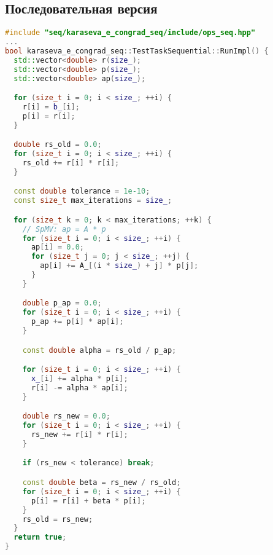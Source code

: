 \documentclass[12pt]{article}
\begin{document}
\subsection{Последовательная версия}
\begin{lstlisting}[language=C++]
#include "seq/karaseva_e_congrad_seq/include/ops_seq.hpp"
...
bool karaseva_e_congrad_seq::TestTaskSequential::RunImpl() {
  std::vector<double> r(size_);
  std::vector<double> p(size_);
  std::vector<double> ap(size_);

  for (size_t i = 0; i < size_; ++i) {
    r[i] = b_[i];
    p[i] = r[i];
  }

  double rs_old = 0.0;
  for (size_t i = 0; i < size_; ++i) {
    rs_old += r[i] * r[i];
  }

  const double tolerance = 1e-10;
  const size_t max_iterations = size_;

  for (size_t k = 0; k < max_iterations; ++k) {
    // SpMV: ap = A * p
    for (size_t i = 0; i < size_; ++i) {
      ap[i] = 0.0;
      for (size_t j = 0; j < size_; ++j) {
        ap[i] += A_[(i * size_) + j] * p[j];
      }
    }

    double p_ap = 0.0;
    for (size_t i = 0; i < size_; ++i) {
      p_ap += p[i] * ap[i];
    }

    const double alpha = rs_old / p_ap;

    for (size_t i = 0; i < size_; ++i) {
      x_[i] += alpha * p[i];
      r[i] -= alpha * ap[i];
    }

    double rs_new = 0.0;
    for (size_t i = 0; i < size_; ++i) {
      rs_new += r[i] * r[i];
    }

    if (rs_new < tolerance) break;

    const double beta = rs_new / rs_old;
    for (size_t i = 0; i < size_; ++i) {
      p[i] = r[i] + beta * p[i];
    }
    rs_old = rs_new;
  }
  return true;
}
\end{lstlisting}
\end{document}
